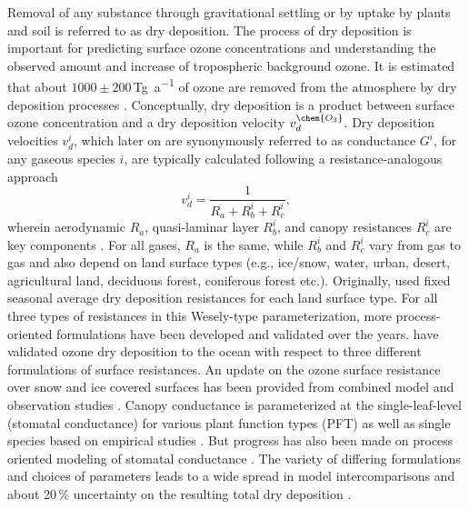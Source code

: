 \documentclass[gmd, manuscript]{copernicus}
\begin{document}
Removal of any substance through gravitational settling or by uptake by plants and soil is referred to as dry deposition. The process of dry deposition is important for predicting surface ozone concentrations and understanding the observed amount and increase of tropospheric background ozone. It is estimated that about $1000 \pm 200$\,\unit{Tg a^{-1}} of ozone are removed from the atmosphere by dry deposition processes \citep{ACP:Monks2015}. Conceptually, dry deposition is a product between surface ozone concentration  and a dry deposition velocity $v^\chem{O_3}_d$. Dry deposition velocities $v^i_d$, which later on are synonymously referred to as conductance $G^i$, for any gaseous species $i$, are typically calculated following a resistance-analogous approach
\begin{equation}
  v^i_d = \frac{1}{R_a + R^i_b + R^i_c},
  \label{eq:drydep_velo}
\end{equation}
wherein aerodynamic $R_a$, quasi-laminar layer $R^i_b$, and canopy resistances $R^i_c$ are key components \citep{AE:Wesely1989,ACP:Seinfeld2006}. For all gases, $R_a$ is the same, while $R^i_b$ and $R^i_c$ vary from gas to gas and also depend on land surface types (e.g., ice/snow, water, urban, desert, agricultural land, deciduous forest, coniferous forest etc.). Originally, \citet{AE:Wesely1989} used fixed seasonal average dry deposition resistances for each land surface type. For all three types of resistances in this Wesely-type parameterization, more process-oriented formulations have been developed and validated over the years. \citet{ACP:Luhar2017} have validated ozone dry deposition to the ocean with respect to three different formulations of surface resistances. An update on the ozone surface resistance over snow and ice covered surfaces has been provided from combined model and observation studies \citep[][$v^\chem{O_3}_\text{ice/snow} = 1/10000\,\unit{cm s^{-1}}$]{ACP:Helmig2007}. Canopy conductance is parameterized at the single-leaf-level (stomatal conductance) for various plant function types (PFT) as well as single species based on empirical studies \citep{PTRS:Jarvis1976, BallBerry1987, ACP:Simpson2012, ICP:MappingManual2017}. But progress has also been made on process oriented modeling of stomatal conductance \citep{AFM:Anderson2000,PP:Buckley2017}. The variety of differing formulations and choices of parameters leads to a wide spread in model intercomparisons \citep{ACP:Hardacre2015,AE:Derwent2018} and about 20\,\unit{\%} uncertainty on the resulting total dry deposition \citep{ACP:Monks2015}.\\
\end{document}
